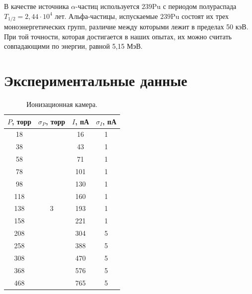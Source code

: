 \documentclass[a4paper,12pt]{article} %
\begin{document}
	В качестве источника $\alpha$-частиц используется ${239}$Pu с периодом полураспада $T_{1/2} = 2,44 \cdot 10^4$ лет. Альфа-частицы, испускаемые ${239}$Pu состоят их трех моноэнергетических групп, различие между которыми лежит в пределах 50 кэВ. При той точности, которая достигается в наших опытах, их можно считать совпадающими по энергии, равной 5,15 МэВ.
	
	
	\newpage
	\section{Экспериментальные данные}
		\begin{table}[H]
			\caption{Ионизационная камера.}
			\label{table:exp3}
			\begin{tabular}{|c|c|c|c|}
				\hline
				$P$, торр & $\sigma_P$, торр    & $I$, пА & $\sigma_I$, пА \\ \hline
				18        & \multirow{35}{*}{3} & 16      & 1              \\ \cline{1-1} \cline{3-4} 
				38        &                     & 43      & 1              \\ \cline{1-1} \cline{3-4} 
				58        &                     & 71      & 1              \\ \cline{1-1} \cline{3-4} 
				78        &                     & 101     & 1              \\ \cline{1-1} \cline{3-4} 
				98        &                     & 130     & 1              \\ \cline{1-1} \cline{3-4} 
				118       &                     & 160     & 1              \\ \cline{1-1} \cline{3-4} 
				138       &                     & 193     & 1              \\ \cline{1-1} \cline{3-4} 
				158       &                     & 221     & 1              \\ \cline{1-1} \cline{3-4} 
				208       &                     & 304     & 5              \\ \cline{1-1} \cline{3-4} 
				258       &                     & 388     & 5              \\ \cline{1-1} \cline{3-4} 
				308       &                     & 470     & 5              \\ \cline{1-1} \cline{3-4} 
				368       &                     & 576     & 5              \\ \cline{1-1} \cline{3-4} 
				468       &                     & 765     & 5              \\ \cline{1-1} \cline{3-4} 

\end{tabular}
\end{table}
\end{document}
